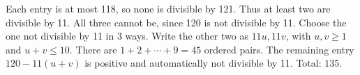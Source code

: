 Each entry is at most 118, so none is divisible by 121. Thus at least two are divisible by 11. All three cannot be, since 120 is not divisible by 11. Choose the one not divisible by 11 in 3 ways. Write the other two as $11u,11v$, with $u,v\ge1$ and $u+v\le10$. There are $1+2+\cdots+9=45$ ordered pairs. The remaining entry $120-11(u+v)$ is positive and automatically not divisible by 11. Total: $\boxed{135}$.
